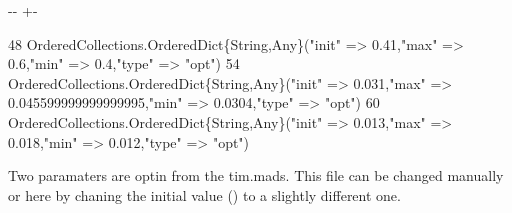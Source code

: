 \documentclass[a4paper,10pt,english]{sphinxmanual}
\newlength\nbsphinxcodecellspacing
\begin{document}
{

\kern-\sphinxverbatimsmallskipamount\kern-\baselineskip
\kern+\FrameHeightAdjust\kern-\fboxrule
\vspace{\nbsphinxcodecellspacing}

\begin{sphinxVerbatim}[commandchars=\\\{\}]
48
OrderedCollections.OrderedDict\{String,Any\}("init" => 0.41,"max" => 0.6,"min" => 0.4,"type" => "opt")
54
OrderedCollections.OrderedDict\{String,Any\}("init" => 0.031,"max" => 0.045599999999999995,"min" => 0.0304,"type" => "opt")
60
OrderedCollections.OrderedDict\{String,Any\}("init" => 0.013,"max" => 0.018,"min" => 0.012,"type" => "opt")
\end{sphinxVerbatim}
}

\sphinxAtStartPar
Two paramaters are opt\sphinxhyphen{}in from the tim.mads. This file can be changed manually or here by chaning the initial value () to a slightly different one.

{
\begin{sphinxVerbatim}[commandchars=\\\{\}]
\llap{\color{nbsphinxin}[20]:\,\hspace{\fboxrule}\hspace{\fboxsep}}
\PYG{p}{[}\PYG{p}{]}\PYG{p}{[}\PYG{p}{]}\PYG{p}{[}\PYG{p}{]} 
\PYG{p}{[}\PYG{p}{]}\PYG{p}{[}\PYG{p}{]}
\end{sphinxVerbatim}
}
\end{document}
